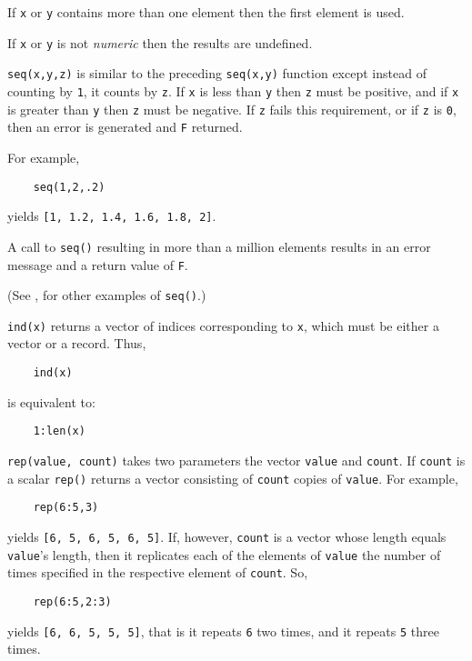\begin{sloppy}
\begin{list}{}{}
If {\tt x} or {\tt y} contains more than one element then the first
element is used.

If {\tt x} or {\tt y} is not {\em numeric\/} then the results are undefined.

\item[{\tt seq(x,y,z)}] \label{seq3-func} 
is similar to the preceding {\tt seq(x,y)} function
except instead of counting by {\tt 1}, it counts by {\tt z}.  If {\tt x}
is less than {\tt y} then {\tt z} must be positive, and if {\tt x} is greater
than {\tt y} then {\tt z} must be negative.  If {\tt z} fails this requirement,
or if {\tt z} is {\tt 0}, then an error is generated and {\tt F} returned.

For example,
\begin{verbatim}
    seq(1,2,.2)
\end{verbatim}
yields {\tt [1, 1.2, 1.4, 1.6, 1.8, 2]}.

A call to {\tt seq()} resulting in more than a million elements results
in an error message and a return value of {\tt F}.

(See , for other examples of {\tt seq()}.)

\item[{\tt ind(x)}] \label{ind-func} 
returns a vector of indices corresponding to {\tt x},
which must be either a vector or a record.  Thus,
\begin{verbatim}
    ind(x)
\end{verbatim}
is equivalent to:
\begin{verbatim}
    1:len(x)
\end{verbatim}

\item[{\tt rep(value, count)}] \label{rep-func} 
takes two parameters the vector {\tt value} and {\tt count}.
If {\tt count} is a scalar {\tt rep()} returns a vector
consisting of {\tt count} copies of {\tt value}.  For example,
\begin{verbatim}
    rep(6:5,3)
\end{verbatim}
yields {\tt [6, 5, 6, 5, 6, 5]}. If, however, {\tt count} is
a vector whose  length equals {\tt value}'s length, then it
replicates each of the elements of {\tt value} the number of
times specified in the respective element of {\tt count}. So,
\begin{verbatim}
    rep(6:5,2:3)
\end{verbatim}
yields {\tt [6, 6, 5, 5, 5]}, that is it repeats {\tt 6} two
times, and it repeats {\tt 5} three times.


\end{list}
\end{sloppy}
